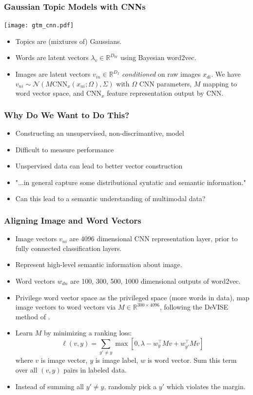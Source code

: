 \documentclass{beamer}
\begin{document}
\begin{frame}
  \frametitle{Gaussian Topic Models with CNNs}
  \begin{center}
    \texttt{[image: gtm\_cnn.pdf]}
  \end{center}
  {\small
  \begin{itemize}
  \item Topics are (mixtures of) Gaussians.
  \item Words are latent vectors $\lambda_v \in \mathbb{R}^{D_W}$ using Bayesian word2vec.
  \item Images are latent vectors $v_{in} \in \mathbb{R}^{D_I}$ \emph{conditioned} on raw images $x_{di}$. We have $v_{ni} \sim \mathcal{N}(M \text{CNN}_x(x_{ni} ; \Omega), \Sigma)$ with $\Omega$ CNN parameters, $M$ mapping to word vector space, and $\text{CNN}_x$ feature representation output by CNN.
  \end{itemize}
  \par}
\end{frame}

\begin{frame}
  \frametitle{Why Do We Want to Do This?}
  \begin{itemize}
  \item Constructing an unsupervised, non-discrimantive, model
  \item Difficult to measure performance \citep{Wallach09a}
  \item Unspervised data can lead to better vector construction
  \item "...in general capture some distributional syntatic and semantic information." \citep{Socher13a}
  \item Can this lead to a semantic understanding of multimodal data?
  \end{itemize}
\end{frame}

\begin{frame}
  \frametitle{Aligning Image and Word Vectors}
  \begin{itemize}
    \item Image vectors $v_{ni}$ are 4096 dimensional CNN representation layer, prior to fully connected classification layers.
    \item Represent high-level semantic information about image.
    \item Word vectors $w_{dn}$ are {100, 300, 500, 1000} dimensional outputs of word2vec.
    \item Privilege word vector space as the privileged space (more words in data), map image vectors to word vectors via $M \in \mathbb{R}^{300 \times 4096}$, following the DeVISE method of \citet{Frome13}.
    \item Learn $M$ by minimizing a ranking loss: $$\ell(v, y) = \sum_{y' \neq y} \max \left[0, \lambda - w_{y}^\top M v + w_{y'} ^\top M v \right]$$ where $v$ is image vector, $y$ is image label, $w$ is word vector. Sum this term over all $(v, y)$ pairs in labeled data.
    \item Instead of summing all $y' \neq y$, randomly pick a $y'$ which violates the margin.
  \end{itemize}
\end{frame}
\end{document}
